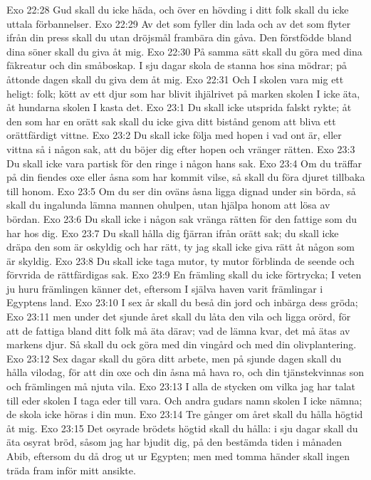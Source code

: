Exo 22:28  Gud skall du icke häda, och över en hövding i ditt folk skall du icke uttala förbannelser.
Exo 22:29  Av det som fyller din lada och av det som flyter ifrån din press skall du utan dröjsmål frambära din gåva. Den förstfödde bland dina söner skall du giva åt mig.
Exo 22:30  På samma sätt skall du göra med dina fäkreatur och din småboskap. I sju dagar skola de stanna hos sina mödrar; på åttonde dagen skall du giva dem åt mig.
Exo 22:31  Och I skolen vara mig ett heligt: folk; kött av ett djur som har blivit ihjälrivet på marken skolen I icke äta, åt hundarna skolen I kasta det.
Exo 23:1  Du skall icke utsprida falskt rykte; åt den som har en orätt sak skall du icke giva ditt bistånd genom att bliva ett orättfärdigt vittne.
Exo 23:2  Du skall icke följa med hopen i vad ont är, eller vittna så i någon sak, att du böjer dig efter hopen och vränger rätten.
Exo 23:3  Du skall icke vara partisk för den ringe i någon hans sak.
Exo 23:4  Om du träffar på din fiendes oxe eller åsna som har kommit vilse, så skall du föra djuret tillbaka till honom.
Exo 23:5  Om du ser din oväns åsna ligga dignad under sin börda, så skall du ingalunda lämna mannen ohulpen, utan hjälpa honom att lösa av bördan.
Exo 23:6  Du skall icke i någon sak vränga rätten för den fattige som du har hos dig.
Exo 23:7  Du skall hålla dig fjärran ifrån orätt sak; du skall icke dräpa den som är oskyldig och har rätt, ty jag skall icke giva rätt åt någon som är skyldig.
Exo 23:8  Du skall icke taga mutor, ty mutor förblinda de seende och förvrida de rättfärdigas sak.
Exo 23:9  En främling skall du icke förtrycka; I veten ju huru främlingen känner det, eftersom I själva haven varit främlingar i Egyptens land.
Exo 23:10  I sex år skall du beså din jord och inbärga dess gröda;
Exo 23:11  men under det sjunde året skall du låta den vila och ligga orörd, för att de fattiga bland ditt folk må äta därav; vad de lämna kvar, det må ätas av markens djur. Så skall du ock göra med din vingård och med din olivplantering.
Exo 23:12  Sex dagar skall du göra ditt arbete, men på sjunde dagen skall du hålla vilodag, för att din oxe och din åsna må hava ro, och din tjänstekvinnas son och främlingen må njuta vila.
Exo 23:13  I alla de stycken om vilka jag har talat till eder skolen I taga eder till vara. Och andra gudars namn skolen I icke nämna; de skola icke höras i din mun.
Exo 23:14  Tre gånger om året skall du hålla högtid åt mig.
Exo 23:15  Det osyrade brödets högtid skall du hålla: i sju dagar skall du äta osyrat bröd, såsom jag har bjudit dig, på den bestämda tiden i månaden Abib, eftersom du då drog ut ur Egypten; men med tomma händer skall ingen träda fram inför mitt ansikte.
